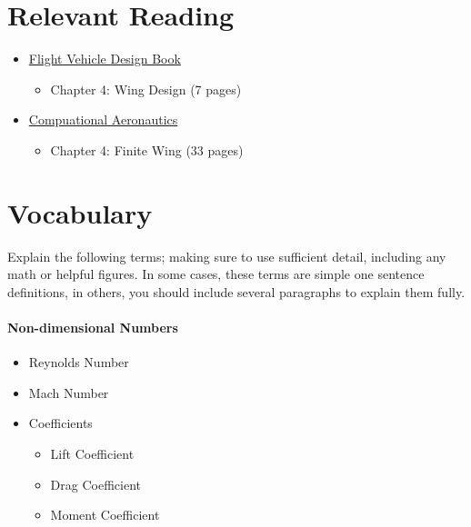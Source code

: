 \documentclass[11pt,twocolumn]{article}
\begin{document}
	
	
	
\section*{Relevant Reading}
\label{sec:reading}

\begin{itemize}
	\item \href{http://flowlab.groups.et.byu.net/me415/flight.pdf}{Flight Vehicle Design Book}
	\begin{itemize}
		\item Chapter 4: Wing Design (7 pages)
	\end{itemize}
	\item \href{https://byu.box.com/shared/static/ywfayozbj3sr2ot6b32u8nqk5brqvurt.pdf}{Compuational Aeronautics}
	\begin{itemize}
		\item Chapter 4: Finite Wing (33 pages)
	\end{itemize}
\end{itemize}




\section{Vocabulary}
\label{sec:vocab}

Explain the following terms; making sure to use sufficient detail, including any math or helpful figures.
In some cases, these terms are simple one sentence definitions, in others, you should include several paragraphs to explain them fully.

\paragraph{Non-dimensional Numbers}
\begin{itemize}
	\item Reynolds Number
	\item Mach Number
	\item Coefficients
	\begin{itemize}
		\item Lift Coefficient
		\item Drag Coefficient
		\item Moment Coefficient
	\end{itemize}
\end{itemize}
\end{document}
